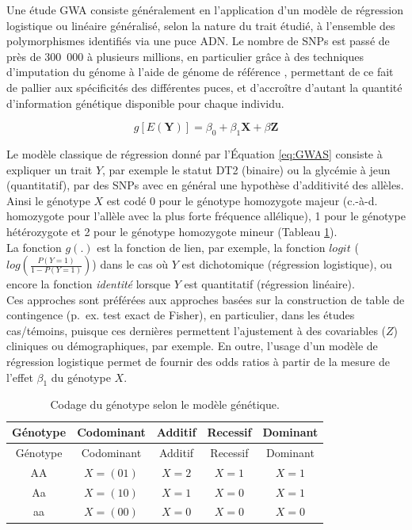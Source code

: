 \documentclass[11pt,a4paper,notrimn]{krantz}
\theoremstyle{definition}
\theoremstyle{definition}
\theoremstyle{remark}
\begin{document}
Une étude GWA consiste généralement en l'application d'un modèle de
régression logistique ou linéaire généralisé, selon la nature du trait
étudié, à l'ensemble des polymorphismes identifiés via une puce ADN. Le
nombre de SNPs est passé de près de 300~000 à plusieurs millions, en
particulier grâce à des techniques d'imputation du génome
\citep{howie_genotype_2011} à l'aide de génome de référence
\citep{the_1000_genomes_project_consortium_global_2015}, permettant de
ce fait de pallier aux spécificités des différentes puces, et
d'accroître d'autant la quantité d'information génétique disponible pour
chaque individu.

\begin{equation}g[E(\boldsymbol{Y})]=\beta_0 + \beta_1 \boldsymbol{X} + \beta \boldsymbol{Z}\label{eq:GWAS}\end{equation}

Le modèle classique de régression donné par l'Équation \eqref{eq:GWAS}
consiste à expliquer un trait \(Y\), par exemple le statut DT2 (binaire)
ou la glycémie à jeun (quantitatif), par des SNPs avec en général une
hypothèse d'additivité des allèles. Ainsi le génotype \(X\) est codé 0
pour le génotype homozygote majeur (c.-à-d. homozygote pour l'allèle
avec la plus forte fréquence allélique), 1 pour le génotype hétérozygote
et 2 pour le génotype homozygote mineur (Tableau
\ref{tab:codingGenotype}).\\
La fonction \(g(.)\) est la fonction de lien, par exemple, la fonction
\(logit\) (\(log\left(\frac{P(Y=1)}{1-P(Y=1)}\right)\)) dans le cas où
\(Y\) est dichotomique (régression logistique), ou encore la fonction
\emph{identité} lorsque \(Y\) est quantitatif (régression linéaire).\\
Ces approches sont préférées aux approches basées sur la construction de
table de contingence (p.~ex. test exact de Fisher), en particulier, dans
les études cas/témoins, puisque ces dernières permettent l'ajustement à
des covariables (\(Z\)) cliniques ou démographiques, par exemple. En
outre, l'usage d'un modèle de régression logistique permet de fournir
des odds ratios à partir de la mesure de l'effet \(\beta_1\) du génotype
\(X\).



\begin{longtable}[]{@{}ccccc@{}}
\caption{\label{tab:codingGenotype}Codage du génotype selon le modèle génétique.}\tabularnewline
\toprule
Génotype & Codominant & Additif & Recessif & Dominant\tabularnewline
\midrule
\endfirsthead
\toprule
Génotype & Codominant & Additif & Recessif & Dominant\tabularnewline
\midrule
\endhead
AA & \(X=(01)\) & \(X=2\) & \(X=1\) & \(X=1\)\tabularnewline
Aa & \(X=(10)\) & \(X=1\) & \(X=0\) & \(X=1\)\tabularnewline
aa & \(X=(00)\) & \(X=0\) & \(X=0\) & \(X=0\)\tabularnewline
\bottomrule
\end{longtable}
\end{document}
